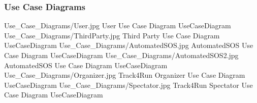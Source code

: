 \documentclass[../../../rasd.tex]{subfiles}
\begin{document}
\subsubsection{Use Case Diagrams}
\image {13cm} {Use_Case_Diagrams/User.jpg} {User Use Case Diagram} {UseCaseDiagram}
\image {13cm} {Use_Case_Diagrams/ThirdParty.jpg} {Third Party Use Case Diagram} {UseCaseDiagram}
\image {13cm} {Use_Case_Diagrams/AutomatedSOS.jpg} {AutomatedSOS Use Case Diagram} {UseCaseDiagram}
\image {13cm} {Use_Case_Diagrams/AutomatedSOS2.jpg} {AutomatedSOS Use Case Diagram} {UseCaseDiagram}
\image {13cm} {Use_Case_Diagrams/Organizer.jpg} {Track4Run Organizer Use Case Diagram} {UseCaseDiagram}
\image {13cm} {Use_Case_Diagrams/Spectator.jpg} {Track4Run Spectator Use Case Diagram} {UseCaseDiagram}
\end{document}
